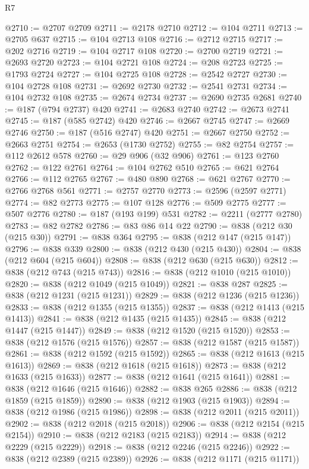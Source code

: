 \begin{lexlean}{R7}
\begin{coremodule}
@2710 := @2707 @2709
@2711 := @2178 @2710
@2712 := @104 @2711
@2713 := @2705 @637
@2715 := @104 @2713 @108
@2716 := @2712 @2715
@2717 := @202 @2716
@2719 := @104 @2717 @108
@2720 := @2700 @2719
@2721 := @2693 @2720
@2723 := @104 @2721 @108
@2724 := @208 @2723
@2725 := @1793 @2724
@2727 := @104 @2725 @108
@2728 := @2542 @2727
@2730 := @104 @2728 @108
@2731 := @2692 @2730
@2732 := @2541 @2731
@2734 := @104 @2732 @108
@2735 := @2674 @2734
@2737 := @2690 @2735 @2681
@2740 := @187 (@794 @2737) @420
@2741 := @2683 @2740
@2742 := @2673 @2741
@2745 := @187 (@585 @2742) @420
@2746 := @2667 @2745
@2747 := @2669 @2746
@2750 := @187 (@516 @2747) @420
@2751 := @2667 @2750
@2752 := @2663 @2751
@2754 := @2653 (@1730 @2752)
@2755 := @82 @2754
@2757 := @112 @2612 @578
@2760 := @29 @906 (@32 @906)
@2761 := @123 @2760
@2762 := @122 @2761
@2764 := @104 @2762 @510
@2765 := @621 @2764
@2766 := @112 @2765
@2767 := @480 @890
@2768 := @621 @2767
@2770 := @2766 @2768 @561
@2771 := @2757 @2770
@2773 := @2596 (@2597 @2771)
@2774 := @82 @2773
@2775 := @107 @128
@2776 := @509 @2775
@2777 := @507 @2776
@2780 := @187 (@193 @199) @531
@2782 := @2211 (@2777 @2780)
@2783 := @82 @2782
@2786 := @83 @86 @14 @22
@2790 := @838 (@212 @30 (@215 @30))
@2791 := @838 @364
@2795 := @838 (@212 @147 (@215 @147))
@2796 := @838 @339
@2800 := @838 (@212 @430 (@215 @430))
@2804 := @838 (@212 @604 (@215 @604))
@2808 := @838 (@212 @630 (@215 @630))
@2812 := @838 (@212 @743 (@215 @743))
@2816 := @838 (@212 @1010 (@215 @1010))
@2820 := @838 (@212 @1049 (@215 @1049))
@2821 := @838 @287
@2825 := @838 (@212 @1231 (@215 @1231))
@2829 := @838 (@212 @1236 (@215 @1236))
@2833 := @838 (@212 @1355 (@215 @1355))
@2837 := @838 (@212 @1413 (@215 @1413))
@2841 := @838 (@212 @1435 (@215 @1435))
@2845 := @838 (@212 @1447 (@215 @1447))
@2849 := @838 (@212 @1520 (@215 @1520))
@2853 := @838 (@212 @1576 (@215 @1576))
@2857 := @838 (@212 @1587 (@215 @1587))
@2861 := @838 (@212 @1592 (@215 @1592))
@2865 := @838 (@212 @1613 (@215 @1613))
@2869 := @838 (@212 @1618 (@215 @1618))
@2873 := @838 (@212 @1633 (@215 @1633))
@2877 := @838 (@212 @1641 (@215 @1641))
@2881 := @838 (@212 @1646 (@215 @1646))
@2882 := @838 @265
@2886 := @838 (@212 @1859 (@215 @1859))
@2890 := @838 (@212 @1903 (@215 @1903))
@2894 := @838 (@212 @1986 (@215 @1986))
@2898 := @838 (@212 @2011 (@215 @2011))
@2902 := @838 (@212 @2018 (@215 @2018))
@2906 := @838 (@212 @2154 (@215 @2154))
@2910 := @838 (@212 @2183 (@215 @2183))
@2914 := @838 (@212 @2229 (@215 @2229))
@2918 := @838 (@212 @2246 (@215 @2246))
@2922 := @838 (@212 @2389 (@215 @2389))
@2926 := @838 (@212 @1171 (@215 @1171))

\end{coremodule}
\end{lexlean}
